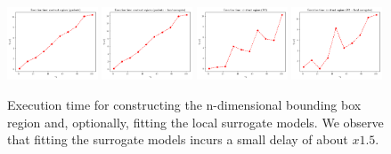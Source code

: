 \begin{figure}[h]
    \begin{center}
      \includegraphics[width=0.24\textwidth]{./Thesis/images/chapter4/exec_regions_grad.png}
      \includegraphics[width=0.24\textwidth]{./Thesis/images/chapter4/exec_regions_grad_fit.png}
      \includegraphics[width=0.24\textwidth]{./Thesis/images/chapter4/exec_regions_bo.png}
      \includegraphics[width=0.24\textwidth]{./Thesis/images/chapter4/exec_regions_bo_fit.png}
    \end{center}
    \caption{Execution time for constructing the n-dimensional
      bounding box region and, optionally, fitting the local surrogate
      models. We observe that fitting the surrogate models incurs a
      small delay of about $x1.5$.}
  \label{fig:exec_regions}
\end{figure}


